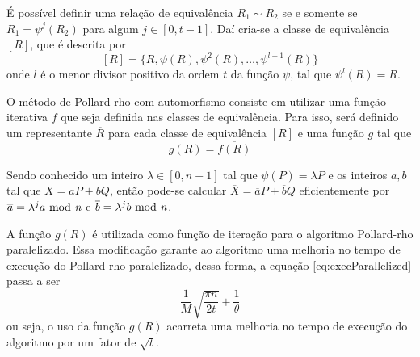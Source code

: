 É possível definir uma relação de equivalência $R_1 \sim R_2$ se e somente se $R_1 = \psi^j(R_2)$ para algum $j \in [0, t - 1]$. Daí cria-se a classe de equivalência $[R]$, que é descrita por
$$
[R] = \{R, \psi(R), \psi^2(R), \dots, \psi^{l-1}(R)\}
$$
onde $l$ é o menor divisor positivo da ordem $t$ da função $\psi$, tal que $\psi^l(R) = R$.

O método de Pollard-rho com automorfismo consiste em utilizar uma função iterativa $f$ que seja definida nas classes de equivalência. Para isso, será definido um representante $\overline{R}$ para cada classe de equivalência $[R]$ e uma função $g$ tal que
$$
g(R) = \overline{f(R)}
$$

Sendo conhecido um inteiro $\lambda \in [0, n - 1]$ tal que $\psi(P) = \lambda P$ e os inteiros $a,b$ tal que $X = aP + bQ$, então pode-se calcular $\overline{X} = \overline{a}P + \overline{b}Q$ eficientemente por $\overline{a} = \lambda^{j}a \mbox{ mod \textit{n}}$ e $\overline{b} = \lambda^{j}b \mbox{ mod \textit{n}}$.

A função $g(R)$ é utilizada como função de iteração para o algoritmo Pollard-rho paralelizado. Essa modificação garante ao algoritmo uma melhoria no tempo de execução do Pollard-rho paralelizado, dessa forma, a equação \ref{eq:execParallelized} passa a ser
$$
\frac{1}{M} \sqrt{ \frac{\pi n}{2t} } + \frac{1}{\theta}
$$
ou seja, o uso da função $g(R)$ acarreta uma melhoria no tempo de execução do algoritmo por um fator de $\sqrt{t}$. \cite{Guide}

